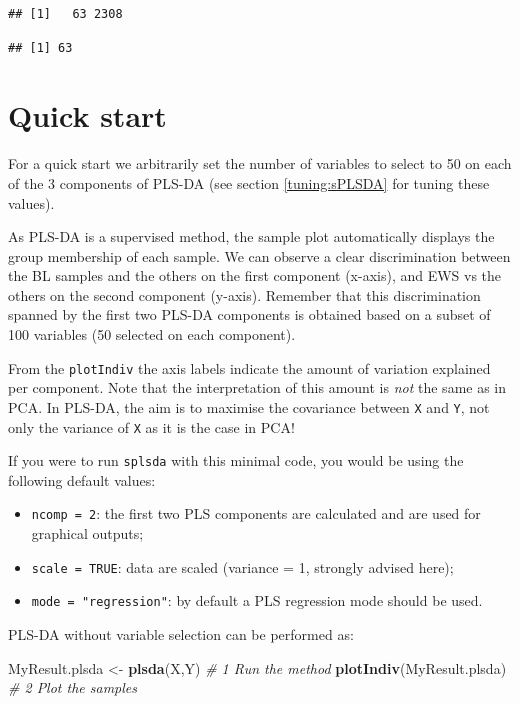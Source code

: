 \documentclass[]{book}
\newenvironment{Shaded}{\begin{snugshade}}{\end{snugshade}}
\newcommand{\CommentTok}[1]{\textcolor[rgb]{0.56,0.35,0.01}{\textit{#1}}}
\newcommand{\KeywordTok}[1]{\textcolor[rgb]{0.13,0.29,0.53}{\textbf{#1}}}
\newcommand{\NormalTok}[1]{#1}
\newcommand{\StringTok}[1]{\textcolor[rgb]{0.31,0.60,0.02}{#1}}
\providecommand{\tightlist}{%
  \setlength{\itemsep}{0pt}\setlength{\parskip}{0pt}}
\begin{document}
\begin{verbatim}
## [1]   63 2308
\end{verbatim}

\begin{verbatim}
## [1] 63
\end{verbatim}

\hypertarget{quick-start-1}{%
\section{Quick start}\label{quick-start-1}}

For a quick start we arbitrarily set the number of variables to select to 50 on each of the 3 components of PLS-DA (see section \ref{tuning:sPLSDA} for tuning these values).

As PLS-DA is a supervised method, the sample plot automatically displays the group membership of each sample. We can observe a clear discrimination between the BL samples and the others on the first component (x-axis), and EWS vs the others on the second component (y-axis). Remember that this discrimination spanned by the first two PLS-DA components is obtained based on a subset of 100 variables (50 selected on each component).

From the \texttt{plotIndiv} the axis labels indicate the amount of variation explained per component. Note that the interpretation of this amount is \emph{not} the same as in PCA. In PLS-DA, the aim is to maximise the covariance between \texttt{X} and \texttt{Y}, not only the variance of \texttt{X} as it is the case in PCA!

If you were to run \texttt{splsda} with this minimal code, you would be using the following default values:

\begin{itemize}
\tightlist
\item
  \texttt{ncomp\ =\ 2}: the first two PLS components are calculated and are used for graphical outputs;
\item
  \texttt{scale\ =\ TRUE}: data are scaled (variance = 1, strongly advised here);
\item
  \texttt{mode\ =\ "regression"}: by default a PLS regression mode should be used.
\end{itemize}

PLS-DA without variable selection can be performed as:

\begin{Shaded}
\begin{Highlighting}[]
\NormalTok{MyResult.plsda <-}\StringTok{ }\KeywordTok{plsda}\NormalTok{(X,Y) }\CommentTok{# 1 Run the method}
\KeywordTok{plotIndiv}\NormalTok{(MyResult.plsda)    }\CommentTok{# 2 Plot the samples}
\end{Highlighting}
\end{Shaded}
\end{document}

